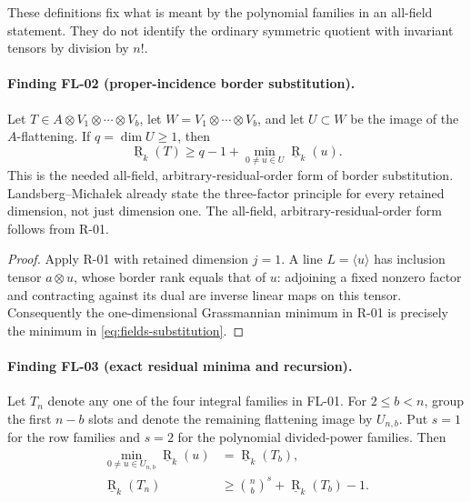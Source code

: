 These definitions fix what is meant by the polynomial families in
an all-field statement. They do not identify the ordinary symmetric
quotient with invariant tensors by division by $n!$.

\paragraph{Finding FL-02 (proper-incidence border substitution).}
Let $T\in A\otimes V_1\otimes\cdots\otimes V_b$, let
$W=V_1\otimes\cdots\otimes V_b$, and let $U\subset W$ be the
image of the $A$-flattening. If $q=\dim U\geq1$, then
\begin{equation}\label{eq:fields-substitution}
 \underline{\operatorname R}_k(T)
 \geq q-1+\min_{0\ne u\in U}\underline{\operatorname R}_k(u).
\end{equation}
This is the needed all-field, arbitrary-residual-order form of
border substitution. Landsberg--Micha\l ek
\cite[Proposition~2.3, p.~3]{LM2018} already state the three-factor
principle for every retained dimension, not just dimension one.
The all-field, arbitrary-residual-order form follows from R-01.

\begin{proof}
Apply R-01 with retained dimension $j=1$. A line
$L=\langle u\rangle$ has inclusion tensor $a\otimes u$,
whose border rank equals that of $u$: adjoining a fixed nonzero
factor and contracting against its dual are inverse linear maps
on this tensor. Consequently the one-dimensional Grassmannian
minimum in R-01 is precisely the minimum in
\eqref{eq:fields-substitution}.
\end{proof}

\paragraph{Finding FL-03 (exact residual minima and recursion).}
Let $T_n$ denote any one of the four integral families in FL-01.
For $2\leq b<n$, group the first $n-b$ slots and denote the
remaining flattening image by $U_{n,b}$. Put $s=1$ for the row
families and $s=2$ for the polynomial divided-power families.
Then
\begin{align}
 \min_{0\ne u\in U_{n,b}}\underline{\operatorname R}_k(u)
     &=\underline{\operatorname R}_k(T_b),\label{eq:fields-minimum}\\
 \underline{\operatorname R}_k(T_n)
     &\geq\binom nb^s+\underline{\operatorname R}_k(T_b)-1.
       \label{eq:fields-recursion}
\end{align}

